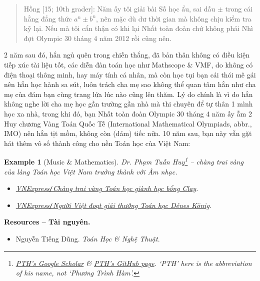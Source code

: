 \documentclass[12pt,oneside]{book}
\newtheorem{example}{Example}
\begin{document}
\begin{quote}
	{\sf Hồng [15; 10th grader]}: Năm ấy tôi giải bài Số học ẩu, sai dấu $\pm$ trong cái hằng đẳng thức $a^n\pm b^n$, nên mặc dù dư thời gian mà không chịu kiểm tra kỹ lại. Nếu mà tôi cẩn thận có khi lại Nhất toàn đoàn chứ không phải Nhì đợt Olympic 30 tháng 4 năm 2012 rồi cũng nên.
\end{quote}
2 năm sau đó, hắn ngủ quên trong chiến thắng, đã bản thân không có điều kiện tiếp xúc tài liệu tốt, các diễn đàn toán học như Mathscope \& VMF, do không có điện thoại thông minh, hay máy tính cá nhân, mà còn học tụi bạn cái thói mê gái nên hắn học hành sa sút, luôn trách cha mẹ sao không thể quan tâm hắn như cha mẹ của đám bạn cùng trang lứa lúc nào cũng lên thăm. Lý do chính là vì do hắn không nghe lời cha mẹ học gần trường gần nhà mà thi chuyên để tự thân 1 mình học xa nhà, trong khi đó, bạn Nhất toàn đoàn Olympic 30 tháng 4 năm ấy ẵm 2 Huy chương Vàng Toán Quốc Tế (International Mathematical Olympiads, abbr., IMO) nên hắn tịt mồm, không còn (dám) tiếc nữa. 10 năm sau, bạn này vẫn gặt hát thêm vô số thành công cho nền Toán học của Việt Nam:

\begin{example}[Music \& Mathematics]
	Dr. {\sc Phạm Tuấn Huy}\footnote{\href{https://scholar.google.com.vn/citations?hl=vi&user=MavyE28AAAAJ}{PTH's Google Scholar} \& \href{https://huytuanpham.github.io/}{PTH's {\sf GitHub} page}. `PTH' here is the abbreviation of his name, not `Phương Trình Hàm'.} -- chàng trai vàng của làng Toán học Việt Nam trưởng thành với Âm nhạc.	
	\begin{itemize}
		\item \href{https://vnexpress.net/chang-trai-vang-toan-hoc-gianh-hoc-bong-clay-4564121.html}{VNExpress{\tt/}Chàng trai vàng Toán học giành học bổng Clay}.
		\item \href{https://vnexpress.net/nguoi-viet-doat-giai-thuong-toan-hoc-denes-k-nig-4742548.html}{VNExpress{\tt/}Người Việt đoạt giải thưởng Toán học Dénes König}.
	\end{itemize}
\end{example}
\noindent\textbf{\textsf{Resources -- Tài nguyên.}}
\begin{itemize}
	\item {\sc Nguyễn Tiếng Dũng}. {\it Toán Học \& Nghệ Thuật}.
\end{itemize}

\end{document}
